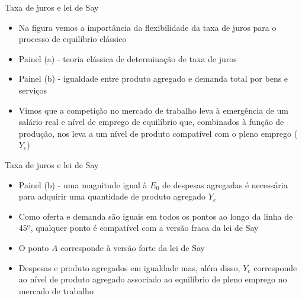 \documentclass[10pt]{beamer}
\begin{document}
\begin{frame}
    {Taxa de juros e lei de Say}
    \begin{itemize}
        \item Na figura vemos a importância da flexibilidade da taxa de juros para o processo de equilíbrio clássico\bigskip
        \item Painel (a) - teoria clássica de determinação de taxa de juros\bigskip
        \item Painel (b) - igualdade entre produto agregado e demanda total por bens e serviços\bigskip
        \item Vimos que a competição no mercado de trabalho leva à emergência de um salário real e nível de emprego de equilíbrio que, combinados à função de produção, nos leva a um nível de produto compatível com o pleno emprego ($Y_e$)
    \end{itemize}
\end{frame}

\begin{frame}
    {Taxa de juros e lei de Say}
    \begin{itemize}
        \item Painel (b) - uma magnitude igual à $E_0$ de despesas agregadas é necessária para adquirir uma quantidade de produto agregado $Y_e$\bigskip
        \item Como oferta e demanda são iguais em todos os pontos ao longo da linha de $45º$, qualquer ponto é compatível com a versão fraca da lei de Say\bigskip
        \item O ponto $A$ corresponde à versão forte da lei de Say\bigskip
        \item Despesas e produto agregados em igualdade mas, além disso, $Y_e$ corresponde ao nível de produto agregado associado ao equilíbrio de pleno emprego no mercado de trabalho
    \end{itemize}
\end{frame}
\end{document}
